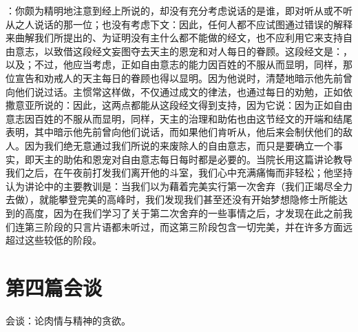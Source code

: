 ：你颇为精明地注意到经上所说的，却没有充分考虑说话的是谁，即对听从或不听从之人说话的那一位；也没有考虑下文：因此，任何人都不应试图通过错误的解释来曲解我们所提出的、为证明没有主什么都不能做的经文，也不应利用它来支持自由意志，以致借这段经文妄图夺去天主的恩宠和对人每日的眷顾。这段经文是：，以及；不过，他应当考虑，正如自由意志的能力因百姓的不服从而显明，同样，那位宣告和劝戒人的天主每日的眷顾也得以显明。因为他说时，清楚地暗示他先前曾向他们说过话。主惯常这样做，不仅通过成文的律法，也通过每日的劝勉，正如依撒意亚所说的：因此，这两点都能从这段经文得到支持，因为它说：因为正如自由意志因百姓的不服从而显明，同样，天主的治理和助佑也由这节经文的开端和结尾表明，其中暗示他先前曾向他们说话，而如果他们肯听从，他后来会制伏他们的敌人。因为我们绝无意通过我们所说的来废除人的自由意志，而只是要确立一个事实，即天主的助佑和恩宠对自由意志每日每时都是必要的。当院长用这篇讲论教导我们之后，在午夜前打发我们离开他的斗室，我们心中充满痛悔而非轻松；他坚持认为讲论中的主要教训是：当我们以为藉着完美实行第一次舍弃（我们正竭尽全力去做），就能攀登完美的高峰时，我们发现我们甚至还没有开始梦想隐修士所能达到的高度，因为在我们学习了关于第二次舍弃的一些事情之后，才发现在此之前我们连第三阶段的只言片语都未听过，而这第三阶段包含一切完美，并在许多方面远超过这些较低的阶段。\par



\section{第四篇会谈}

\par

会谈：论肉情与精神的贪欲。\par

